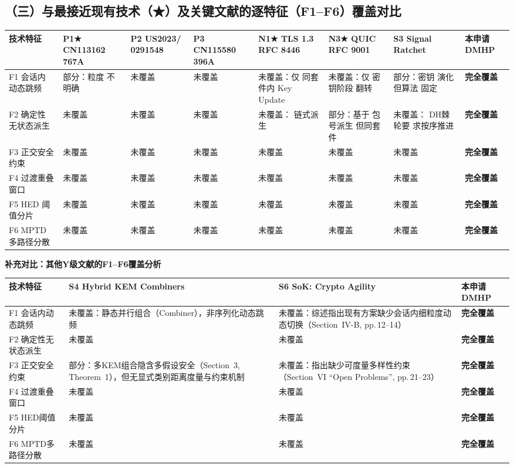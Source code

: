 \documentclass[12pt,a4paper]{article}
\begin{document}
\subsection*{（三）与最接近现有技术（★）及关键文献的逐特征（F1--F6）覆盖对比}


\begin{longtable}{|p{1.5cm}|p{1.8cm}|p{1.8cm}|p{1.8cm}|p{1.8cm}|p{1.8cm}|p{1.8cm}|p{1.8cm}|}
\hline
\textbf{技术特征} & \textbf{P1★  CN113162  767A} & \textbf{P2  US2023/  0291548} & \textbf{P3  CN115580  396A} & \textbf{N1★  TLS 1.3  RFC 8446} & \textbf{N3★  QUIC  RFC 9001} & \textbf{S3  Signal  Ratchet} & \textbf{本申请  DMHP} \\
\hline
F1 会话内  动态跳频 & 部分：粒度  不明确 & 未覆盖 & 未覆盖 & 未覆盖：仅  同套件内  Key Update & 未覆盖：仅  密钥阶段  翻转 & 部分：密钥  演化但算法  固定 & \textbf{完全覆盖} \\
\hline
F2 确定性  无状态派生 & 未覆盖 & 未覆盖 & 未覆盖 & 未覆盖：  链式派生 & 部分：基于  包号派生  但同套件 & 未覆盖：  DH棘轮要  求按序推进 & \textbf{完全覆盖} \\
\hline
F3 正交安全  约束 & 未覆盖 & 未覆盖 & 未覆盖 & 未覆盖 & 未覆盖 & 未覆盖 & \textbf{完全覆盖} \\
\hline
F4 过渡重叠  窗口 & 未覆盖 & 未覆盖 & 未覆盖 & 未覆盖 & 未覆盖 & 未覆盖 & \textbf{完全覆盖} \\
\hline
F5 HED  阈值分片 & 未覆盖 & 未覆盖 & 未覆盖 & 未覆盖 & 未覆盖 & 未覆盖 & \textbf{完全覆盖} \\
\hline
F6 MPTD  多路径分散 & 未覆盖 & 未覆盖 & 未覆盖 & 未覆盖 & 未覆盖 & 未覆盖 & \textbf{完全覆盖} \\
\hline
\end{longtable}

\noindent\textbf{补充对比：其他Y级文献的F1--F6覆盖分析}


\begin{longtable}{|p{2.0cm}|p{3.5cm}|p{3.5cm}|p{5.5cm}|}
\hline
\textbf{技术特征} & \textbf{S4 Hybrid KEM Combiners} & \textbf{S6 SoK: Crypto Agility} & \textbf{本申请 DMHP} \\
\hline
F1 会话内动态跳频 & 未覆盖：静态并行组合（Combiner），非序列化动态跳频 & 未覆盖：综述指出现有方案缺少会话内细粒度动态切换（Section~IV-B, pp.\,12--14） & \textbf{完全覆盖} \\
\hline
F2 确定性无状态派生 & 未覆盖 & 未覆盖 & \textbf{完全覆盖} \\
\hline
F3 正交安全约束 & 部分：多KEM组合隐含多假设安全（Section~3, Theorem~1），但无显式类别距离度量与约束机制 & 未覆盖：指出缺少可度量多样性约束（Section~VI ``Open Problems'', pp.\,21--23） & \textbf{完全覆盖} \\
\hline
F4 过渡重叠窗口 & 未覆盖 & 未覆盖 & \textbf{完全覆盖} \\
\hline
F5 HED阈值分片 & 未覆盖 & 未覆盖 & \textbf{完全覆盖} \\
\hline
F6 MPTD多路径分散 & 未覆盖 & 未覆盖 & \textbf{完全覆盖} \\
\hline
\end{longtable}
\end{document}
